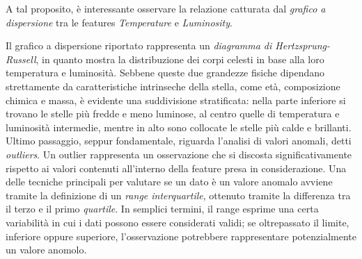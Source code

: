 \documentclass{article}
\begin{document}
    A tal proposito, è interessante osservare la relazione catturata dal \textit{grafico a dispersione} tra le features \textit{Temperature} e \textit{Luminosity}.
    \begin{center}
    \end{center}
    Il grafico a dispersione riportato rappresenta un \textit{diagramma di Hertzsprung-Russell}, in quanto mostra la distribuzione dei corpi celesti in base alla loro temperatura e luminosità. Sebbene queste due grandezze fisiche dipendano strettamente da caratteristiche intrinseche della stella, come età, composizione chimica e massa, è evidente una suddivisione stratificata: nella parte inferiore si trovano le stelle più fredde e meno luminose, al centro quelle di temperatura e luminosità intermedie, mentre in alto sono collocate le stelle più calde e brillanti. \vspace*{7pt}\\
    Ultimo passaggio, seppur fondamentale, riguarda l'analisi di valori anomali, detti \textit{outliers}. Un outlier rappresenta un osservazione che si discosta significativamente rispetto ai valori contenuti all'interno della feature presa in considerazione. Una delle tecniche principali per valutare se un dato è un valore anomalo avviene tramite la definizione di un \textit{range interquartile}, ottenuto tramite la differenza tra il terzo e il primo \textit{quartile}. In semplici termini, il range esprime una certa variabilità in cui i dati possono essere considerati validi; se oltrepassato il limite, inferiore oppure superiore, l'osservazione potrebbere rappresentare potenzialmente un valore anomolo.
\end{document}
